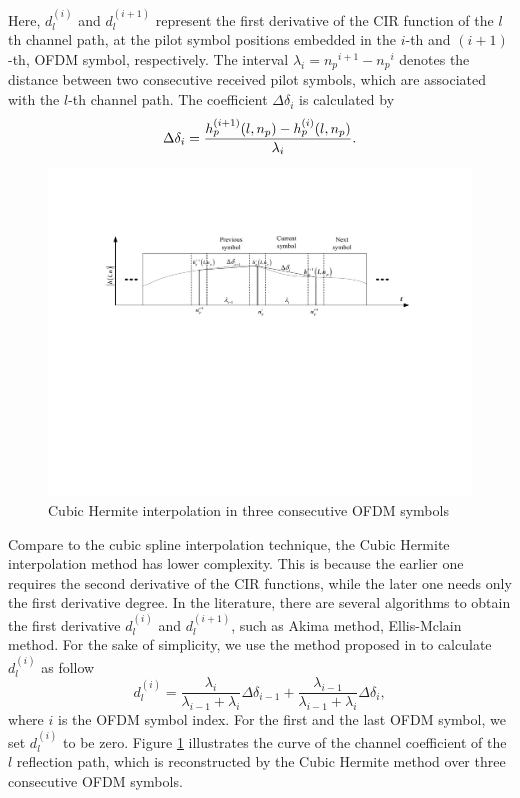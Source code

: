\documentclass[12pt,journal,draftclsnofoot,onecolumn]{IEEEtran}
\begin{document}
{{Here, $d^{(i)}_{l}$ and $d^{(i+1)}_{l}$ represent the first derivative of the CIR function of the $l$th channel path,  at the pilot symbol positions embedded in the  $i$-th and $(i+1)$-th, OFDM symbol, respectively. The interval ${\lambda_{i}} = {n_p}^{i+1}-{n_p}^{i} $ denotes the distance between two consecutive received pilot symbols, which are associated with the  $l$-th channel path. The coefficient ${\Delta {\delta _i}}$ is calculated by
%
\begin{equation*}
	\centering
	\Delta {\delta _i} =\frac{h^{(i+1)}_{p}(l,n_p) - h^{(i)}_{p}(l,n_p)}{\lambda_{i}}.
\end{equation*}
%
\begin{figure}
		\centering
		\includegraphics[width=1.0\linewidth]{figures/derivative_cubic_hermite}
		\caption{Cubic Hermite interpolation in three consecutive OFDM symbols}
		\label{fig:derivativecubichermite}
\end{figure}	
%			
Compare to the cubic spline interpolation technique, the Cubic Hermite interpolation method has lower complexity. This is because the earlier one requires the second derivative of the CIR functions, while the later one needs only the first derivative degree. 
In the literature, there are several algorithms to obtain the first derivative $d^{(i)}_{l}$ and $d^{(i+1)}_{l}$, such as  Akima method, Ellis-Mclain method. For the sake of simplicity, we use the method proposed in \cite{ Fritsch1980} to calculate $d^{(i)}_{l}$ as follow
%
\begin{equation}
d^{(i)}_{l} = \dfrac{\lambda_{i}}{\lambda_{i-1}+\lambda_{i}}{\Delta {\delta _{i-1}}} + \dfrac{\lambda_{i-1}}{\lambda_{i-1}+\lambda_{i}}{\Delta {\delta _i}}, 	
\end{equation}
where $i$ is the  OFDM symbol index. For the first and the last OFDM symbol, we set $d^{(i)}_{l}$ to be zero. Figure \ref{fig:derivativecubichermite} illustrates the curve of the  channel coefficient of the $l$ reflection path, which is reconstructed by the Cubic Hermite method over three consecutive OFDM symbols.

}}
\end{document}
